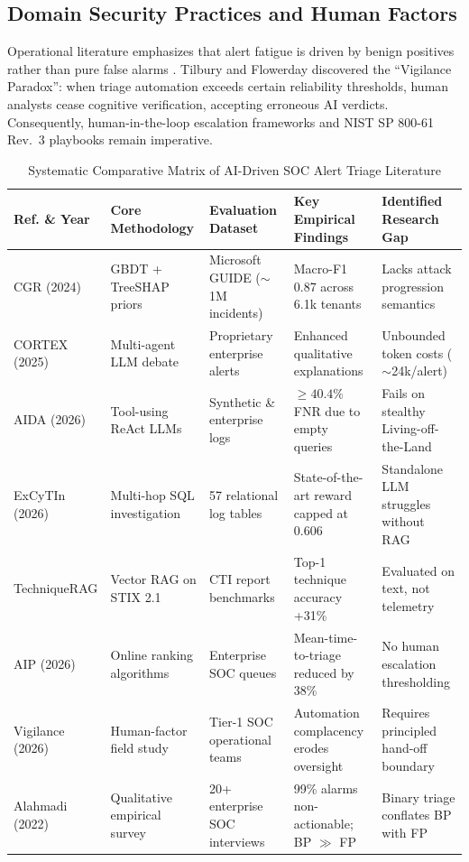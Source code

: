 \subsection{Domain Security Practices and Human Factors}
Operational literature emphasizes that alert fatigue is driven by benign positives rather than pure false alarms \cite{alahmadi2022falsepositives, ndichu2026survey}. Tilbury and Flowerday \cite{tilbury2026vigilance} discovered the ``Vigilance Paradox'': when triage automation exceeds certain reliability thresholds, human analysts cease cognitive verification, accepting erroneous AI verdicts. Consequently, human-in-the-loop escalation frameworks and NIST SP 800-61 Rev.~3 playbooks \cite{nist2025sp80061r3} remain imperative.

\begin{table}[t]
\caption{Systematic Comparative Matrix of AI-Driven SOC Alert Triage Literature}
\label{tab:literature}
\centering
\small
\begin{tabular}{lp{3.2cm}p{3.5cm}p{3.2cm}p{3.5cm}}
\toprule
\textbf{Ref. \& Year} & \textbf{Core Methodology} & \textbf{Evaluation Dataset} & \textbf{Key Empirical Findings} & \textbf{Identified Research Gap} \\
\midrule
CGR (2024) \cite{freitas2024cgr} & GBDT + TreeSHAP priors & Microsoft GUIDE ($\sim$1M incidents) & Macro-F1 0.87 across 6.1k tenants & Lacks attack progression semantics \\
CORTEX (2025) \cite{wei2025cortex} & Multi-agent LLM debate & Proprietary enterprise alerts & Enhanced qualitative explanations & Unbounded token costs ($\sim$24k/alert) \\
AIDA (2026) \cite{tsegai2026aida} & Tool-using ReAct LLMs & Synthetic \& enterprise logs & $\ge 40.4\%$ FNR due to empty queries & Fails on stealthy Living-off-the-Land \\
ExCyTIn (2026) \cite{wu2026excytin} & Multi-hop SQL investigation & 57 relational log tables & State-of-the-art reward capped at 0.606 & Standalone LLM struggles without RAG \\
TechniqueRAG \cite{lekssays2025techniquerag} & Vector RAG on STIX 2.1 & CTI report benchmarks & Top-1 technique accuracy +31\% & Evaluated on text, not telemetry \\
AIP (2026) \cite{freitas2026aip} & Online ranking algorithms & Enterprise SOC queues & Mean-time-to-triage reduced by 38\% & No human escalation thresholding \\
Vigilance (2026) \cite{tilbury2026vigilance} & Human-factor field study & Tier-1 SOC operational teams & Automation complacency erodes oversight & Requires principled hand-off boundary \\
Alahmadi (2022) \cite{alahmadi2022falsepositives} & Qualitative empirical survey & 20+ enterprise SOC interviews & 99\% alarms non-actionable; BP $\gg$ FP & Binary triage conflates BP with FP \\
\bottomrule
\end{tabular}
\end{table}
